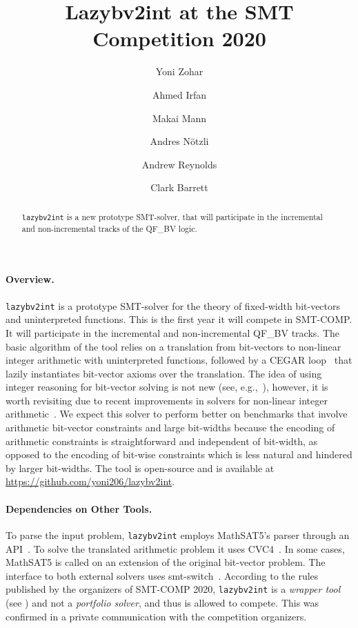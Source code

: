\documentclass{easychair}
\newcommand{\lazybvtoint}{\texttt{lazybv2int}\xspace}
\newcommand{\smtcomp}{SMT-COMP\xspace}
\newcommand{\qfbv}{QF\_BV\xspace}
\newcommand{\msat}{MathSAT5\xspace}
\newcommand{\cvcfour}{CVC4\xspace}
\newcommand{\smtswitch}{smt-switch\xspace}
\begin{document}
\author{
		Yoni Zohar\and
		Ahmed Irfan \and
		Makai Mann \and
		Andres N\"otzli \and
		Andrew Reynolds\and
		Clark Barrett
}

\title{Lazybv2int at the SMT Competition 2020}

\maketitle


\noindent
\begin{abstract}
\noindent \lazybvtoint is a new prototype SMT-solver, that will participate in
the incremental and non-incremental tracks of the \qfbv logic.
\end{abstract}

\paragraph{Overview.}
\lazybvtoint is a prototype SMT-solver for the theory of fixed-width bit-vectors
and uninterpreted functions. This is the first year it will compete in \smtcomp.
It will participate in the incremental and non-incremental \qfbv tracks.
%
The basic algorithm of the tool relies on a translation from bit-vectors to
non-linear integer arithmetic with uninterpreted functions, followed by a CEGAR
loop~\cite{cegar} that lazily instantiates bit-vector axioms over the
translation. The idea of using integer reasoning for bit-vector solving is not
new (see,
e.g.,~\cite{DBLP:journals/entcs/BozzanoBCFHKPS06,DBLP:conf/fmcad/BackemanRZ18}),
however, it is worth revisiting due to recent improvements in solvers for
non-linear integer arithmetic~\cite{DBLP:conf/vmcai/Jovanovic17,
  DBLP:conf/sat/CimattiGIRS18}.
%
We expect this solver to perform better on benchmarks that involve arithmetic
bit-vector constraints and large bit-widths because the encoding of arithmetic
constraints is straightforward and independent of bit-width, as opposed to the
encoding of bit-wise constraints which is less natural and hindered by larger
bit-widths.
%
The tool is open-source and is available at \url{https://github.com/yoni206/lazybv2int}.

\paragraph{Dependencies on Other Tools.}
%
To parse the input problem, \lazybvtoint employs \msat's
parser through an API~\cite{mathsat5}.
To solve the translated arithmetic problem it uses \cvcfour~\cite{cvc4}.
In some cases, \msat is called on an extension of the original bit-vector problem.
%
The interface to both external solvers uses
\smtswitch~\cite{smtswitchgithub}.
%
According to the rules published by the organizers
of \smtcomp 2020, \lazybvtoint is a {\em wrapper tool} (see \cite{rules20})
and not a {\em portfolio solver},
and thus is allowed to compete.
This was confirmed in a private communication with the competition organizers.
\end{document}
